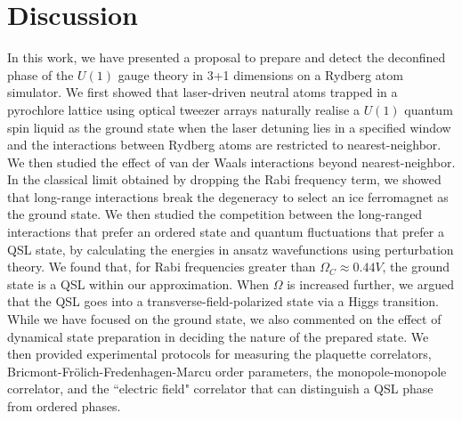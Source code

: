 \documentclass[twocolumn,superscriptaddress,amsmath,amssymb,aps,prx,nofootinbib]{revtex4-2}
\begin{document}
\section{Discussion}\label{sec:discussion}

In this work, we have presented a proposal to prepare and detect the deconfined phase of the $U(1)$ gauge theory in 3+1 dimensions on a Rydberg atom simulator. We first showed that laser-driven  neutral atoms trapped in a pyrochlore lattice using optical tweezer arrays naturally realise a $U(1)$ quantum spin liquid as the ground state when the laser detuning lies in a specified window and the interactions between Rydberg atoms are restricted to nearest-neighbor. We then studied the effect of van der Waals interactions beyond nearest-neighbor. In the classical limit obtained by dropping the Rabi frequency term, we showed that long-range interactions break the degeneracy to select an ice ferromagnet as the ground state. We then studied the competition between the long-ranged interactions that prefer an ordered state and quantum fluctuations that prefer a QSL state, by calculating the energies in ansatz wavefunctions using perturbation theory. We found that, for Rabi frequencies greater than $\Omega_C \approx 0.44 V$, the ground state is a QSL within our approximation. When $\Omega$ is increased further, we argued that the QSL goes into a transverse-field-polarized state via a Higgs transition. While we have focused on the ground state, we also commented on the effect of dynamical state preparation in deciding the nature of the prepared state. We then provided experimental protocols for measuring the plaquette correlators, Bricmont-Fr{\"o}lich-Fredenhagen-Marcu order parameters, the monopole-monopole correlator, and the ``electric field" correlator that can distinguish a QSL phase from ordered phases.
\end{document}
